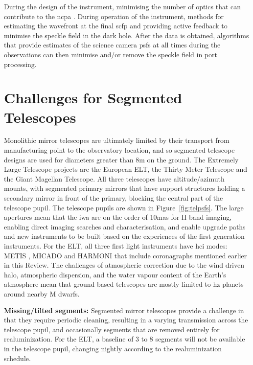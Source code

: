 \documentclass[letterpaper]{ar-1col}
\begin{document}
During the design of the instrument, minimising the number of optics that can contribute to the \ac{ncpa} \citep[by making the optics optomechanically and thermally stable; ][]{Absil24}.
%
During operation of the instrument, methods for estimating the wavefront at the final \ac{scfp} and providing active feedback to minimise the speckle field in the dark hole.
%    
After the data is obtained, algorithms that provide estimates of the science camera \acp{psf} at all times during the observations can then minimise and/or remove the speckle field in port processing.

\section{Challenges for Segmented Telescopes}
Monolithic mirror telescopes are ultimately limited by their transport from manufacturing point to the observatory location, and so segmented telescope designs are used for diameters greater than 8m on the ground.
%
The Extremely Large Telescope projects are the European ELT, the Thirty Meter Telescope and the Giant Magellan Telescope.
%
All three telescopes have altitude/azimuth mounts, with segmented primary mirrors that have support structures holding a secondary mirror in front of the primary, blocking the central part of the telescope pupil.
%
The telescope pupils are shown in Figure~\ref{fig:telpsfs}.
%
The large apertures mean that the \ac{iwa} are on the order of 10mas for H band imaging, enabling direct imaging searches and characterisation, and enable upgrade paths and new instruments to be built based on the experiences of the first generation instruments.
%
For the ELT, all three first light instruments have \ac{hci} modes: METIS \citep{Brandl22,Absil24}, MICADO \citep{Sturm24,Huby24} and HARMONI \citep{Thatte22,Houlle21} that include coronagraphs mentioned earlier in this Review.
%
The challenges of atmospheric correction due to the wind driven halo, atmospheric dispersion, and the water vapour content of the Earth's atmosphere mean that ground based telescopes are mostly limited to \ac{hz} planets around nearby M dwarfs.

{\bf Missing/tilted segments:} Segmented mirror telescopes provide a challenge in that they require periodic cleaning, resulting in a varying transmission across the telescope pupil, and occasionally segments that are removed entirely for realuminization.
%
For the ELT, a baseline of 3 to 8 segments will not be available in the telescope pupil, changing nightly according to the realuminization schedule.
\end{document}
